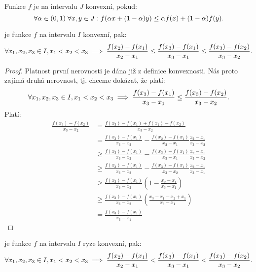 \begin{remark}
    Funkce $f$ je na intervalu $J$ konvexní, pokud:
    $$\forall \alpha \in (0,1) \; \forall x,y \in J: f(\alpha x + (1-\alpha)y) \leq
    \alpha f(x) + (1-\alpha)f(y).$$
\end{remark}

\begin{lemma}
    \label{lm:konvexita}
    \Necht je funkce $f$ na intervalu $I$ konvexní, pak:
    $$\forall x_1,x_2,x_3 \in I, x_1 < x_2 < x_3 \implies
    \frac{f(x_2) - f(x_1)}{x_2 - x_1} \leq \frac{f(x_3) - f(x_1)}{x_3 - x_1}
    \leq \frac{f(x_3) - f(x_2)}{x_3 - x_2}.$$
\end{lemma}

\begin{proof}
    Platnost první nerovnosti je dána již z definice konvexnosti. Nás proto
    zajímá druhá nerovnost, tj. chceme dokázat, že platí:
    $$\forall x_1,x_2,x_3 \in I, x_1 < x_2 < x_3 \implies
    \frac{f(x_3) - f(x_1)}{x_3 - x_1}
    \leq \frac{f(x_3) - f(x_2)}{x_3 - x_2}.$$
    Platí:
    \begin{align*}
        \frac{f(x_3) - f(x_2)}{x_3 - x_2} 
        &= \frac{f(x_3) - f(x_1) + f(x_1) - f(x_2)}{x_3 - x_2} \\
        &=    \frac{f(x_3) - f(x_1)}{x_3 - x_2} - \frac{f(x_2) - f(x_1)}{x_2 - x_1} \frac{x_2 - x_1}{x_3 - x_2} \\
        &\geq \frac{f(x_3) - f(x_1)}{x_3 - x_2} - \frac{f(x_3) - f(x_1)}{x_3 - x_1} \frac{x_2 - x_1}{x_3 - x_2} \tag {z definice konvexity} \\
        &\geq \frac{f(x_3) - f(x_1)}{x_3 - x_2} - \frac{f(x_3) - f(x_1)}{x_3 - x_2} \frac{x_2 - x_1}{x_3 - x_1} \\
        &\geq \frac{f(x_3) - f(x_1)}{x_3 - x_2} \left(1 - \frac{x_2 - x_1}{x_3 - x_1}\right) \\
        &\geq \frac{f(x_3) - f(x_1)}{x_3 - x_2} \left(\frac{x_3 - x_1 - x_2 + x_1}{x_3 - x_1}\right) \\
        &= \frac{f(x_3) - f(x_1)}{x_3 - x_1}
    \end{align*}
\end{proof}

\begin{lemma}
    \Necht je funkce $f$ na intervalu $I$ ryze konvexní, pak:
    $$\forall x_1,x_2,x_3 \in I, x_1 < x_2 < x_3 \implies
    \frac{f(x_2) - f(x_1)}{x_2 - x_1} < \frac{f(x_3) - f(x_1)}{x_3 - x_1}
    < \frac{f(x_3) - f(x_2)}{x_3 - x_2}.$$
\end{lemma}

